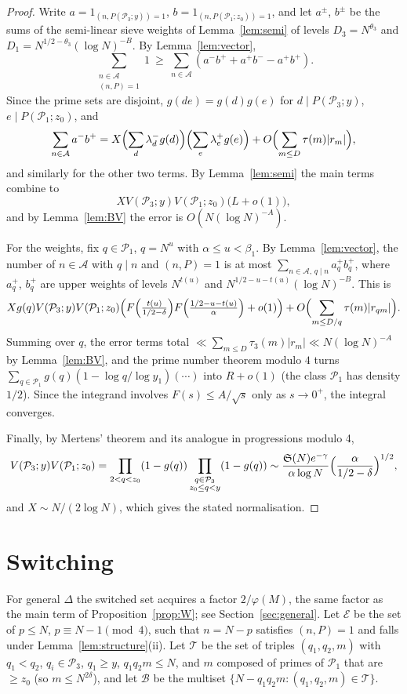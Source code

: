 \documentclass[11pt]{amsart}
\theoremstyle{remark}
\newcommand{\cA}{\mathcal{A}}
\newcommand{\cB}{\mathcal{B}}
\newcommand{\cE}{\mathcal{E}}
\newcommand{\cP}{\mathcal{P}}
\newcommand{\cT}{\mathcal{T}}
\newcommand{\Sg}{\mathfrak{S}}
\begin{document}
\begin{proof}
Write $a=1_{(n,P(\cP_3;y))=1}$, $b=1_{(n,P(\cP_1;z_0))=1}$, and let $a^\pm$, $b^\pm$ be the sums of the
semi-linear sieve weights of Lemma~\ref{lem:semi} of levels $D_3=N^{\theta_3}$ and
$D_1=N^{1/2-\theta_3}(\log N)^{-B}$. By Lemma~\ref{lem:vector},
\[
\sum_{\substack{n\in\cA\\(n,P)=1}}1\ \ge\ \sum_{n\in\cA}(a^-b^++a^+b^--a^+b^+).
\]
Since the prime sets are disjoint, $g(de)=g(d)g(e)$ for $d\mid P(\cP_3;y)$, $e\mid P(\cP_1;z_0)$, and
\[
\sum_{n\in\cA}a^-b^+=X\Bigl(\sum_d\lambda^-_dg(d)\Bigr)\Bigl(\sum_e\lambda^+_eg(e)\Bigr)
+O\Bigl(\sum_{m\le D}\tau(m)|r_m|\Bigr),
\]
and similarly for the other two terms. By Lemma~\ref{lem:semi} the main terms combine to
\[
XV(\cP_3;y)V(\cP_1;z_0)\bigl(L+o(1)\bigr),
\]
and by Lemma~\ref{lem:BV} the error is $O(N(\log N)^{-A})$.

For the weights, fix $q\in\cP_1$, $q=N^u$ with $\alpha\le u<\beta_1$. By Lemma~\ref{lem:vector}, the
number of $n\in\cA$ with $q\mid n$ and $(n,P)=1$ is at most $\sum_{n\in\cA,\,q\mid n}a^+_qb^+_q$, where
$a_q^+$, $b_q^+$ are upper weights of levels $N^{t(u)}$ and $N^{1/2-u-t(u)}(\log N)^{-B}$. This is
\[
Xg(q)V(\cP_3;y)V(\cP_1;z_0)\Bigl(F\Bigl(\tfrac{t(u)}{1/2-\delta}\Bigr)F\Bigl(\tfrac{1/2-u-t(u)}{\alpha}\Bigr)
+o(1)\Bigr)+O\Bigl(\sum_{m\le D/q}\tau(m)|r_{qm}|\Bigr).
\]
Summing over $q$, the error terms total $\ll\sum_{m\le D}\tau_3(m)|r_m|\ll N(\log N)^{-A}$ by
Lemma~\ref{lem:BV}, and the prime number theorem modulo $4$ turns
$\sum_{q\in\cP_1}g(q)(1-\log q/\log y_1)(\cdots)$ into $R+o(1)$ (the class $\cP_1$ has density $1/2$).
Since the integrand involves $F(s)\le A/\sqrt s$ only as $s\to 0^+$, the integral converges.

Finally, by Mertens' theorem and its analogue in progressions modulo 4,
\[
V(\cP_3;y)V(\cP_1;z_0)=\prod_{\substack{2<q<z_0}}(1-g(q))\prod_{\substack{q\in\cP_3\\ z_0\le q<y}}(1-g(q))
\sim\frac{\Sg(N)e^{-\gamma}}{\alpha\log N}\Bigl(\frac{\alpha}{1/2-\delta}\Bigr)^{1/2},
\]
and $X\sim N/(2\log N)$, which gives the stated normalisation.
\end{proof}

\section{Switching}\label{sec:switch}

For general $\Delta$ the switched set acquires a factor $2/\varphi(M)$, the same factor as the main term
of Proposition~\ref{prop:W}; see Section~\ref{sec:general}.
Let $\cE$ be the set of $p\le N$, $p\equiv N-1\pmod 4$, such that $n=N-p$ satisfies $(n,P)=1$ and falls
under Lemma~\ref{lem:structure}(ii). Let $\cT$ be the set of triples $(q_1,q_2,m)$ with $q_1<q_2$,
$q_i\in\cP_3$, $q_1\ge y$, $q_1q_2m\le N$, and $m$ composed of primes of $\cP_1$ that are $\ge z_0$
(so $m\le N^{2\delta}$), and let $\cB$ be the multiset $\{N-q_1q_2m:(q_1,q_2,m)\in\cT\}$.
\end{document}
